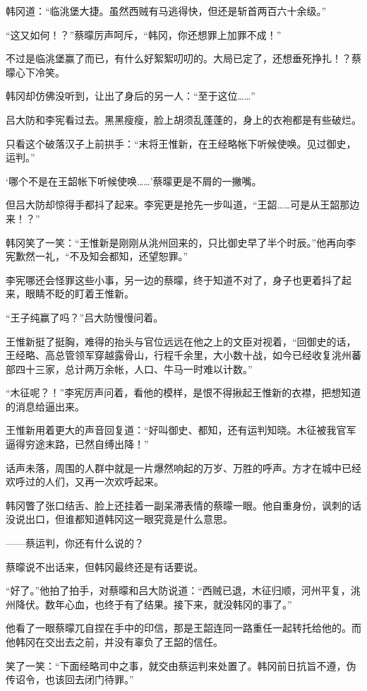 韩冈道：“临洮堡大捷。虽然西贼有马逃得快，但还是斩首两百六十余级。”

“这又如何！？”蔡曚厉声呵斥，“韩冈，你还想罪上加罪不成！”

不过是临洮堡赢了而已，有什么好絮絮叨叨的。大局已定了，还想垂死挣扎！？蔡曚心下冷笑。

韩冈却仿佛没听到，让出了身后的另一人：“至于这位……”

吕大防和李宪看过去。黑黑瘦瘦，脸上胡须乱蓬蓬的，身上的衣袍都是有些破烂。

只看这个破落汉子上前拱手：“末将王惟新，在王经略帐下听候使唤。见过御史，运判。”

‘哪个不是在王韶帐下听候使唤……’蔡曚更是不屑的一撇嘴。

但吕大防却惊得手都抖了起来。李宪更是抢先一步叫道，“王韶……可是从王韶那边来！？”

韩冈笑了一笑：“王惟新是刚刚从洮州回来的，只比御史早了半个时辰。”他再向李宪歉然一礼，“不及知会都知，还望恕罪。”

李宪哪还会怪罪这些小事，另一边的蔡曚，终于知道不对了，身子也更着抖了起来，眼睛不眨的盯着王惟新。

“王子纯赢了吗？”吕大防慢慢问着。

王惟新挺了挺胸，难得的抬头与官位远远在他之上的文臣对视着，“回御史的话，王经略、高总管领军穿越露骨山，行程千余里，大小数十战，如今已经收复洮州蕃部四十三家，总计两万余帐，人口、牛马一时难以计数。”

“木征呢？！”李宪厉声问着，看他的模样，是恨不得揪起王惟新的衣襟，把想知道的消息给逼出来。

王惟新用着更大的声音回复道：“好叫御史、都知，还有运判知晓。木征被我官军逼得穷途末路，已然自缚出降！”

话声未落，周围的人群中就是一片爆然响起的万岁、万胜的呼声。方才在城中已经欢呼过的人们，又再一次欢呼起来。

韩冈瞥了张口结舌、脸上还挂着一副呆滞表情的蔡曚一眼。他自重身份，讽刺的话没说出口，但谁都知道韩冈这一眼究竟是什么意思。

——蔡运判，你还有什么说的？

蔡曚说不出话来，但韩冈最终还是有话要说。

“好了。”他拍了拍手，对蔡曚和吕大防说道：“西贼已退，木征归顺，河州平复，洮州降伏。数年心血，也终于有了结果。接下来，就没韩冈的事了。”

他看了一眼蔡曚兀自捏在手中的印信，那是王韶连同一路重任一起转托给他的。而他韩冈在交出去之前，并没有辜负了王韶的信任。

笑了一笑：“下面经略司中之事，就交由蔡运判来处置了。韩冈前日抗旨不遵，伪传诏令，也该回去闭门待罪。”

